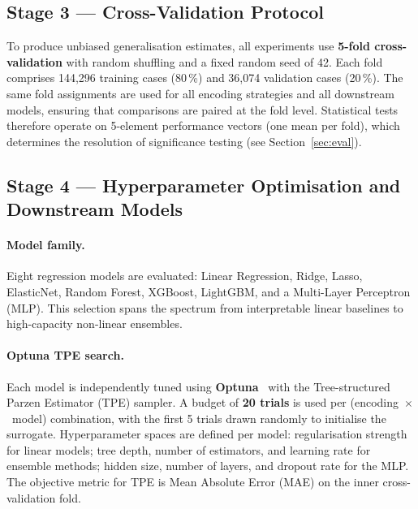 \subsection{Stage 3 — Cross-Validation Protocol}
\label{sec:cv}

To produce unbiased generalisation estimates, all experiments use \textbf{5-fold cross-validation} with random shuffling and a fixed random seed of 42. Each fold comprises 144,296 training cases (80\,\%) and 36,074 validation cases (20\,\%). The same fold assignments are used for all encoding strategies and all downstream models, ensuring that comparisons are paired at the fold level. Statistical tests therefore operate on 5-element performance vectors (one mean per fold), which determines the resolution of significance testing (see Section~\ref{sec:eval}).

\subsection{Stage 4 — Hyperparameter Optimisation and Downstream Models}
\label{sec:hpo}

\paragraph{Model family.}
Eight regression models are evaluated: Linear Regression, Ridge, Lasso, ElasticNet, Random Forest, XGBoost, LightGBM, and a Multi-Layer Perceptron (MLP). This selection spans the spectrum from interpretable linear baselines to high-capacity non-linear ensembles.

\paragraph{Optuna TPE search.}
Each model is independently tuned using \textbf{Optuna}~\cite{akiba2019optuna} with the Tree-structured Parzen Estimator (TPE) sampler. A budget of \textbf{20 trials} is used per (encoding~$\times$~model) combination, with the first 5 trials drawn randomly to initialise the surrogate. Hyperparameter spaces are defined per model: regularisation strength for linear models; tree depth, number of estimators, and learning rate for ensemble methods; hidden size, number of layers, and dropout rate for the MLP. The objective metric for TPE is Mean Absolute Error (MAE) on the inner cross-validation fold.

